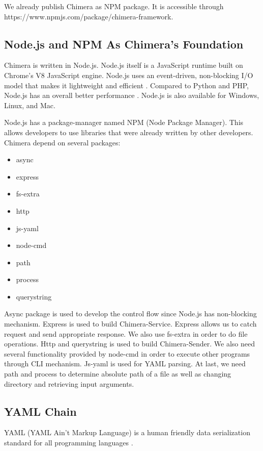 \documentclass[conference]{IEEEtran}
\begin{document}
We already publish Chimera as NPM package. It is accessible through 
https://www.npmjs.com/package/chimera-framework.


\subsection{Node.js and NPM As Chimera's Foundation}

Chimera is written in Node.js. Node.js itself is a JavaScript runtime built on Chrome's 
V8 JavaScript engine. Node.js uses an event-driven, non-blocking I/O model that makes it 
lightweight and efficient \cite{nodejs}. Compared to Python and PHP, Node.js has an 
overall better performance \cite{lei2014performance}. Node.js is also available for
Windows, Linux, and Mac.

Node.js has a package-manager named NPM (Node Package Manager). This allows developers
to use libraries that were already written by other developers. Chimera depend on 
several packages:

\begin{itemize}
    \item async
    \item express
    \item fs-extra
    \item http
    \item js-yaml
    \item node-cmd
    \item path
    \item process
    \item querystring
\end{itemize}

Async package is used to develop the control flow since Node.js has non-blocking
mechanism. Express is used to build Chimera-Service. Express allows us to catch request
and send appropriate response. We also use fs-extra in order to do file operations.
Http and querystring is used to build Chimera-Sender. We also need several functionality
provided by node-cmd in order to execute other programs through CLI mechanism.
Js-yaml is used for YAML parsing. At last, we need path and process to determine 
absolute path of a file as well as changing directory and retrieving input arguments.

\subsection{YAML Chain}

YAML (YAML Ain't Markup Language) is a human friendly data serialization standard for 
all programming languages \cite{yaml}.
\end{document}
